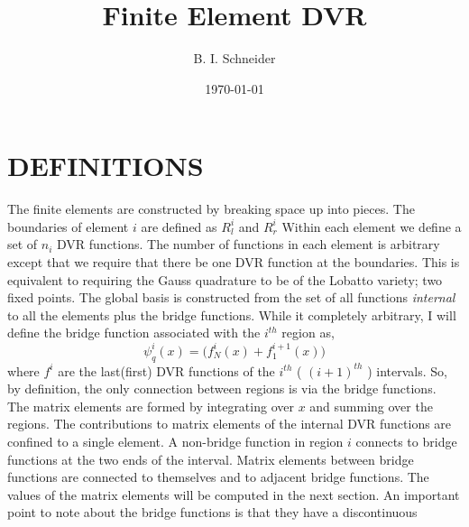 \documentclass[preprint,aps]{revtex4}
\begin{document}
\title{Finite Element DVR}
\author{B. I. Schneider}

\address{ Physics Division, National Science Foundation, Arlington,
Virginia 22230 and Electron and Optical Physics Division, National
Institute of Standards and Technology, Gaithersburg, MD 20899}

\date{\today}

\maketitle

%


\section{DEFINITIONS}
The finite elements are constructed by breaking space up into pieces.  The
boundaries of element $i$ are defined as $R^{i}_{l}$ and $R^{i}_{r}$  Within each
element we define a set of $n_{i}$ DVR functions.  The number of functions in each
element is arbitrary except that we require that there be one DVR function at the
boundaries.  This is equivalent to requiring the Gauss quadrature to be of the
Lobatto variety; two fixed points.  The global basis is constructed from the 
set of all functions {\em internal } to all the elements plus the bridge functions.  While it completely arbitrary, I will define the bridge function 
associated with the $i^{th}$ region as,
\begin{equation}
  \psi^{i}_{q}(x)  = \big ( f^{i}_{N}(x) + f^{i+1}_{1}(x) \big ) 
\end{equation}
where $f^{i}$ are the last(first) DVR functions of the $i^{th}$ ( $(i+1)^{th}$ )
intervals.  So, by definition, the only connection between regions is via the
bridge functions.  The matrix elements are formed by integrating over $x$ and summing
over the regions.  The contributions to matrix elements of the internal DVR 
functions are confined to a single element.  A non-bridge function in region $i$
connects to bridge functions at the two ends of the interval.  Matrix elements between
bridge functions are connected to themselves and to adjacent bridge functions.  The
values of the matrix elements will be computed in the next section.  An important
point to note about the bridge functions is that they have a discontinuous
\end{document}
